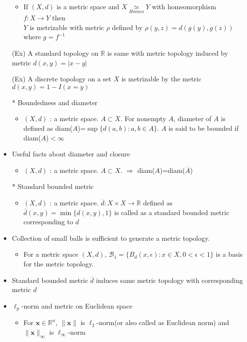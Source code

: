 \documentclass[12pt]{article}
\newcommand{\Real}{\mathbb{R}}
\newcommand{\cl}{\overline}
\newcommand{\homeo}{\underset{Homeo}{\simeq}}
\begin{document}
\begin{itemize}
\begin{itemize}
		\item If $(X,d)$ is a metric space and $X\homeo Y$ with homeomorphism $f:X\rightarrow Y$ then \\ $Y$ is metrizable with metric $\rho$ defined by $\rho(y,z)=d(g(y),g(z))$ where $g=f^{-1}$
	\end{itemize} 
	\item[(Ex)] A standard topology on $\Real$ is same with metric topology induced by metric $d(x,y)=|x-y|$
	\item[(Ex)] A discrete topology on a set $X$ is metrizable by the metric $d(x,y)=1-I(x=y)$
	\item[*] Boundedness and diameter
	\begin{itemize}
		\item $(X,d)$ : a metric space. $A\subset X$. For nonempty $A$, diameter of $A$ is defined as diam($A$)=$\sup\{d(a,b) : a,b\in A\}$. $A$ is said to be bounded if diam($A$)$<\infty$
	\end{itemize}
	\item Useful facts about diameter and closure
	\begin{itemize}
	    \item $(X,d)$ : a metric space. $A\subset X$. $\Rightarrow$ diam($A$)=diam($\cl{A}$) 
	\end{itemize}
	\item[*] Standard bounded metric
	\begin{itemize}
		\item $(X,d)$ : a metric space. $\overline{d} : X\times X\rightarrow \Real$ defined as $\overline{d}(x,y)=\min\{d(x,y),1\}$ is called as a standard bounded metric corresponding to $d$ 
	\end{itemize} 
	\item Collection of small balls is sufficient to generate a metric topology.
	\begin{itemize}
		\item For a metric space $(X,d)$, $\mathcal{B}_1=\{B_d(x,\epsilon): x\in X , 0<\epsilon<1\}$ is a basis for the metric topology.
	\end{itemize}
	\item Standard bounded metric $\overline{d}$ induces same metric topology with corresponding metric $d$
	\item $\ell_p$-norm and metric on Euclidean space
	\begin{itemize}
		\item For $\textbf{x}\in\Real^n$,  $\|\textbf{x}\|$ is $\ell_2$-norm(or also called as Euclidean norm) and $ \|\textbf{x}\|_\infty $ is $\ell_\infty$-norm

\end{itemize}
\end{itemize}
\end{document}
